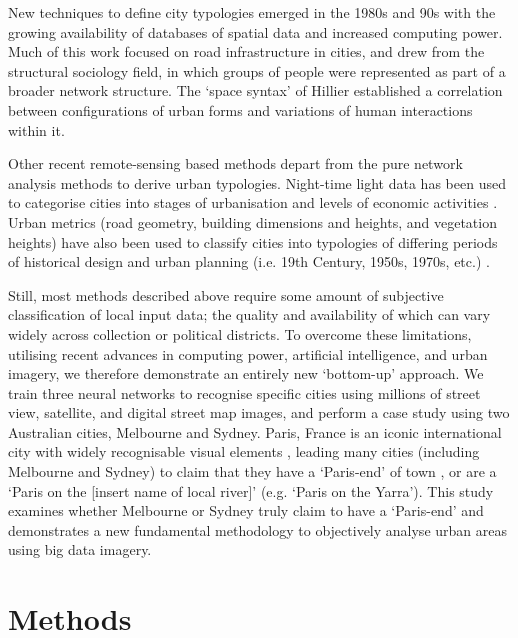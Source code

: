 \documentclass[Crown,sageh,times]{sagej}
\begin{document}
New techniques to define city typologies emerged in the 1980s and 90s with the growing availability of databases of spatial data and increased computing power. Much of this work focused on road infrastructure in cities, and drew from the structural sociology field, in which groups of people were represented as part of a broader network structure. The `space syntax' of Hillier \cite{Hillier1996} established a correlation between configurations of urban forms and variations of human interactions within it. 

Other recent remote-sensing based methods depart from the pure network analysis methods to derive urban typologies. Night-time light data has been used to categorise cities into stages of urbanisation and levels of economic activities \cite{Zhang2013}. Urban metrics (road geometry, building dimensions and heights, and vegetation heights) have also been used to classify cities into typologies of differing periods of historical design and urban planning (i.e. 19th Century, 1950s, 1970s, etc.) \cite{Hermosilla2014}.


Still, most methods described above require some amount of subjective classification of local input data; the quality and availability of which can vary widely across collection or political districts. To overcome these limitations, utilising recent advances in computing power, artificial intelligence, and urban imagery, we therefore demonstrate an entirely new `bottom-up' approach. We train three neural networks to recognise specific cities using millions of street view, satellite, and digital street map images, and perform a case study using two Australian cities, Melbourne and Sydney. Paris, France is an iconic international city \cite{Anholt2006} with widely recognisable visual elements \cite{Doersch2012}, leading many cities (including Melbourne and Sydney) to claim that they have a `Paris-end' of town \cite{Williams2010}, or are a `Paris on the [insert name of local river]' \cite{Wilden2013} (e.g. `Paris on the Yarra'). This study examines whether Melbourne or Sydney truly claim to have a `Paris-end' and demonstrates a new fundamental methodology to objectively analyse urban areas using big data imagery.

\section{Methods}\label{sec:methods}
\end{document}
